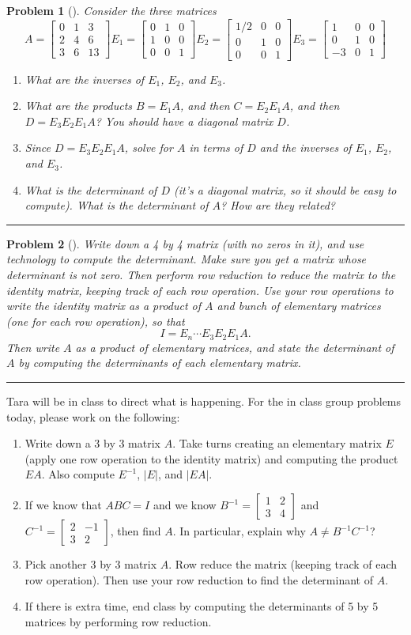 \documentclass[letterpaper,oneside]{book}%
\theoremstyle{plain}
\theoremstyle{box}
\theoremstyle{problem}
\newtheorem{problemnum}{Problem}[chapter]
\newenvironment{problem}[1][]{\begin{problemnum}[#1]}{\end{problemnum}\nopagebreak\hrule\bigskip}
\newcommand{\bvec}[1]{\begin{bmatrix} #1 \end{bmatrix}}
\begin{document}
\begin{problem}
Consider the three matrices 
$$A=\bvec{0&1&3\\2&4&6\\3&6&13}
E_1=\bvec{0&1&0\\1&0&0\\0&0&1}
E_2=\bvec{1/2&0&0\\0&1&0\\0&0&1}
E_3=\bvec{1&0&0\\0&1&0\\-3&0&1}
$$  
\begin{enumerate}
 \item What are the inverses of $E_1$, $E_2$, and $E_3$. 
 \item What are the products $B=E_1A$, and then $C=E_2E_1A$, and then $D=E_3E_2E_1A$? You should have a diagonal matrix $D$. 
 \item Since $D=E_3E_2E_1A$, solve for $A$ in terms of $D$ and the inverses of $E_1$, $E_2$, and $E_3$. 
 \item What is the determinant of $D$ (it's a diagonal matrix, so it should be easy to compute). What is the determinant of $A$? How are they related?
\end{enumerate}
\end{problem}



\begin{problem}
Write down a 4 by 4 matrix (with no zeros in it), and use technology to compute the determinant.  Make sure you get a matrix whose determinant is not zero. Then perform row reduction to reduce the matrix to the identity matrix, keeping track of each row operation. Use your row operations to write the identity matrix as a product of $A$ and bunch of elementary matrices (one for each row operation), so that $$I=E_n\cdots E_3E_2E_1A.$$ Then write $A$ as a product of elementary matrices, and state the determinant of $A$ by computing the determinants of each elementary matrix. 
\end{problem}

Tara will be in class to direct what is happening. For the in class group problems today, please work on the following:
\begin{enumerate}
 \item Write down a 3 by 3 matrix $A$.  Take turns creating an elementary matrix $E$ (apply one row operation to the identity matrix) and computing the product $EA$. Also compute $E^{-1}$, $|E|$, and $|EA|$.
 \item If we know that $ABC=I$ and we know $B^{-1}=\bvec{1&2\\3&4}$ and $C^{-1}=\bvec{2&-1\\3&2}$, then find $A$. In particular, explain why $A\neq B^{-1}C^{-1}$?
 \item Pick another 3 by 3 matrix $A$.  Row reduce the matrix (keeping track of each row operation). Then use your row reduction to find the determinant of $A$. 
 \item If there is extra time, end class by computing the determinants of 5 by 5 matrices by performing row reduction.
\end{enumerate}
\end{document}
